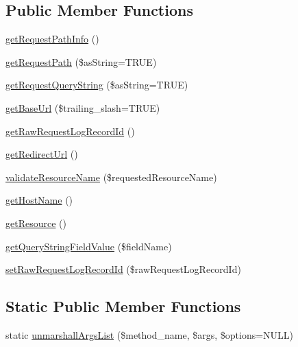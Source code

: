 \subsection*{Public Member Functions}
\begin{DoxyCompactItemize}
\item 
\hyperlink{class_able_polecat___message___request_abstract_a24f01da16b0dd5c8443a359fc63ad6a2}{get\+Request\+Path\+Info} ()
\item 
\hyperlink{class_able_polecat___message___request_abstract_a271cb279757d7442621be8d9cc655456}{get\+Request\+Path} (\$as\+String=T\+R\+U\+E)
\item 
\hyperlink{class_able_polecat___message___request_abstract_a857d46fb7d0a91198f2fdc173f65cf75}{get\+Request\+Query\+String} (\$as\+String=T\+R\+U\+E)
\item 
\hyperlink{class_able_polecat___message___request_abstract_a29afed20445af05cf3ef1c9e63a11c22}{get\+Base\+Url} (\$trailing\+\_\+slash=T\+R\+U\+E)
\item 
\hyperlink{class_able_polecat___message___request_abstract_a22300f7ad45068a4ab569ba6d1a6c605}{get\+Raw\+Request\+Log\+Record\+Id} ()
\item 
\hyperlink{class_able_polecat___message___request_abstract_a320f8cf6bf704c301b24f83e4d0c3a22}{get\+Redirect\+Url} ()
\item 
\hyperlink{class_able_polecat___message___request_abstract_a1e05d92c1527e5fbe83db15156e54457}{validate\+Resource\+Name} (\$requested\+Resource\+Name)
\item 
\hyperlink{class_able_polecat___message___request_abstract_ae78e05faf338016b4c1baeae80316a12}{get\+Host\+Name} ()
\item 
\hyperlink{class_able_polecat___message___request_abstract_a8c5a689e9be7d35d0d01d0194637a7d2}{get\+Resource} ()
\item 
\hyperlink{class_able_polecat___message___request_abstract_a1777165184f881f2a13ff0ad75c9bb20}{get\+Query\+String\+Field\+Value} (\$field\+Name)
\item 
\hyperlink{class_able_polecat___message___request_abstract_aef696836fa5e996d12af5c12882f2c01}{set\+Raw\+Request\+Log\+Record\+Id} (\$raw\+Request\+Log\+Record\+Id)
\end{DoxyCompactItemize}
\subsection*{Static Public Member Functions}
\begin{DoxyCompactItemize}
\item 
static \hyperlink{class_able_polecat___message___request_abstract_a94d2e558bba777f54dcc10f1bfc4dca5}{unmarshall\+Args\+List} (\$method\+\_\+name, \$args, \$options=N\+U\+L\+L)
\end{DoxyCompactItemize}
